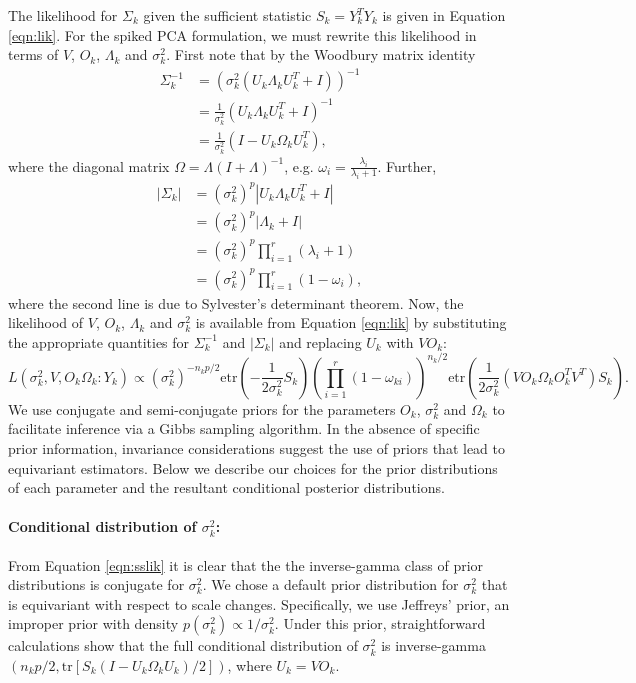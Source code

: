 \documentclass{statsoc}
\newcommand{\tr}{\text{tr}}
\newcommand{\etr}{\text{etr}}
\begin{document}
The likelihood for $\Sigma_k$ given the sufficient statistic
$S_k = Y_k^TY_k$ is given in Equation \ref{eqn:lik}.  For the
spiked PCA formulation, we must rewrite this likelihood in terms of $V$, $O_k$,
$\Lambda_k$ and $\sigma_k^2$.  First note that by the Woodbury matrix
identity
\begin{align}
\nonumber \Sigma^{-1}_k &=  (\sigma_k^2(U_k\Lambda_kU_k^T+I))^{-1}\\
\nonumber &= \frac{1}{\sigma_k^2}(U_k\Lambda_kU_k^T+I)^{-1}\\
&= \frac{1}{\sigma_k^2}(I-U_k\Omega_kU_k^T),
\end{align}
%
\noindent where the diagonal matrix $\Omega = \Lambda(I+\Lambda)^{-1}$, e.g. $\omega_i = \frac{\lambda_i}{\lambda_{i}+1}$.  Further, 
%
\begin{align}
\nonumber |\Sigma_k| &= (\sigma_k^2)^{p}|U_k\Lambda_kU_k^T+I|\\
\nonumber &= (\sigma_k^2)^{p}|\Lambda_k+I| \\
\nonumber &= (\sigma_k^2)^{p}\prod_{i=1}^r(\lambda_i+1)\\
&= (\sigma_k^2)^{p}\prod_{i=1}^r(1-\omega_i),
\end{align}
%
\noindent where the second line is due to Sylvester's determinant
theorem.  Now, the likelihood of $V$, $O_k$, $\Lambda_k$ and
$\sigma_k^2$ is available from Equation \ref{eqn:lik} by substituting
the appropriate quantities for $\Sigma^{-1}_k$ and $|\Sigma_k|$ and
replacing $U_k$ with $VO_k$:
%
\begin{equation}
 L(\sigma_k^2, V , O_k \Omega_k : Y_k) \propto
    (\sigma_k^2)^{-n_kp/2}\etr(-\frac{1}{2\sigma_k^2}S_k)\left(\prod_{i=1}^r(1-\omega_{ki})
   \right) ^{n_k/2}
   \etr(\frac{1}{2\sigma_k^2}(VO_k\Omega_kO_k^TV^T)S_k).
\label{eqn:sslik}
\end{equation}
%
\noindent We use conjugate and semi-conjugate priors for the parameters $O_k$,
$\sigma^2_k$ and $\Omega_k$ to facilitate inference via a Gibbs
sampling algorithm.  In the absence of specific prior information,
invariance considerations suggest the use of priors that lead to
equivariant estimators.  Below we describe our choices for the prior
distributions of each parameter and the resultant conditional posterior
distributions.

\paragraph{Conditional distribution of $\sigma_k^2$:}

From Equation \ref{eqn:sslik} it is clear that the the inverse-gamma
class of prior distributions is conjugate for $\sigma_k^2$.  We chose a
default prior distribution for $\sigma^2_k$ that is equivariant with
respect to scale changes.  Specifically, we use Jeffreys' prior, an
improper prior with density $p(\sigma^2_k) \propto 1/\sigma^2_k $.  Under
this prior, straightforward calculations show that the full
conditional distribution of $\sigma_k^2$ is
inverse-gamma$( n_k p/2 , \tr[S_k( I - U_k\Omega_k
U_k)/2])$, where $U_k = VO_k$.
\end{document}
